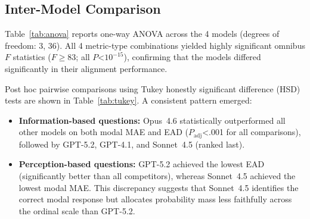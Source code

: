 \subsection{Inter-Model Comparison}

Table~\ref{tab:anova} reports one-way ANOVA across the 4 models (degrees of
freedom: 3, 36). All 4 metric-type combinations yielded highly significant
omnibus $F$ statistics ($F$$\ge$83; all $P$<$10^{-15}$), confirming
that the models differed significantly in their alignment performance.

Post hoc pairwise comparisons using Tukey honestly significant difference (HSD)
tests are shown in Table~\ref{tab:tukey}. A consistent pattern emerged:

\begin{itemize}\itemsep2pt
\item \textbf{Information-based questions:} Opus~4.6 statistically outperformed
  all other models on both modal MAE and EAD ($P_{\text{adj}}$<.001 for all
  comparisons), followed by GPT-5.2, GPT-4.1, and Sonnet~4.5 (ranked last).
\item \textbf{Perception-based questions:} GPT-5.2 achieved the lowest EAD
  (significantly better than all competitors), whereas Sonnet~4.5 achieved the
  lowest modal MAE. This discrepancy suggests that Sonnet~4.5 identifies the
  correct modal response but allocates probability mass less faithfully across
  the ordinal scale than GPT-5.2.
\end{itemize}

